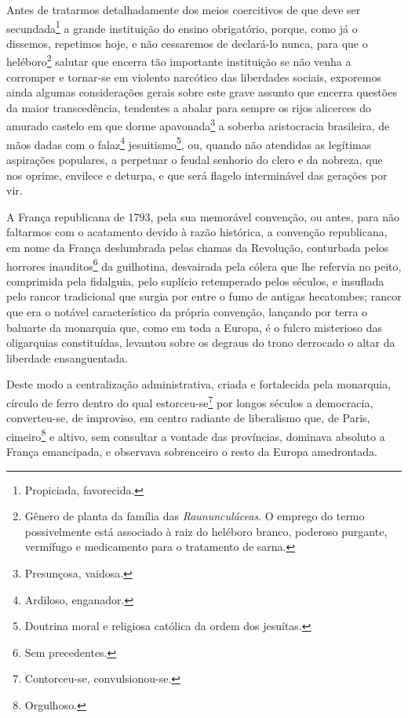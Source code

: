 Antes de tratarmos detalhadamente dos meios coercitivos de que deve ser
secundada\footnote{Propiciada, favorecida.} a grande instituição do
ensino obrigatório, porque, como já o dissemos, repetimos hoje, e não
cessaremos de declará-lo nunca, para que o heléboro\footnote{Gênero de
  planta da família das \emph{Raununculáceas}. O emprego do termo
  possivelmente está associado à raiz do heléboro branco, poderoso
  purgante, vermífugo e medicamento para o tratamento de sarna.} salutar
que encerra tão importante instituição se não venha a corromper e
tornar-se em violento narcótico das liberdades sociais, exporemos ainda
algumas considerações gerais sobre este grave assunto que encerra
questões da maior transcedência, tendentes a abalar para sempre os rijos
alicerces do amurado castelo em que dorme apavonada\footnote{
  Presunçosa, vaidosa.} a soberba aristocracia brasileira, de mãos dadas
com o falaz\footnote{Ardiloso, enganador.} jesuitismo\footnote{
  Doutrina moral e religiosa católica da ordem dos jesuítas.}, ou,
quando não atendidas as legítimas aspirações populares, a perpetuar o
feudal senhorio do clero e da nobreza, que nos oprime, envilece e
deturpa, e que será flagelo interminável das gerações por vir.

A França republicana de 1793, pela sua memorável convenção, ou antes,
para não faltarmos com o acatamento devido à razão histórica, a
convenção republicana, em nome da França deslumbrada pelas chamas da
Revolução, conturbada pelos horrores inauditos\footnote{Sem
  precedentes.} da guilhotina, desvairada pela cólera que lhe refervia
no peito, comprimida pela fidalguia, pelo suplício retemperado pelos
séculos, e insuflada pelo rancor tradicional que surgia por entre o fumo
de antigas hecatombes; rancor que era o notável característico da
própria convenção, lançando por terra o baluarte da monarquia que, como
em toda a Europa, é o fulcro misterioso das oligarquias constituídas,
levantou sobre os degraus do trono derrocado o altar da liberdade
ensanguentada.

Deste modo a centralização administrativa, criada e fortalecida pela
monarquia, círculo de ferro dentro do qual estorceu-se\footnote{
  Contorceu-se, convulsionou-se.} por longos séculos a democracia,
converteu-se, de improviso, em centro radiante de liberalismo que, de
Paris, cimeiro\footnote{Orgulhoso.} e altivo, sem consultar a vontade
das províncias, dominava absoluto a França emancipada, e observava
sobrenceiro o resto da Europa amedrontada.

